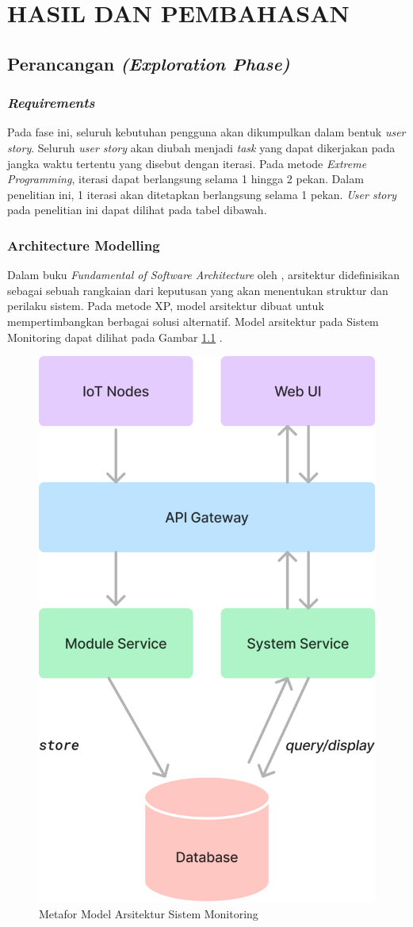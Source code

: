 \chapter{HASIL DAN PEMBAHASAN}

\section{Perancangan \textit{(Exploration Phase)}}

\subsection{\textit{Requirements}}

Pada fase ini, seluruh kebutuhan pengguna akan dikumpulkan dalam bentuk \textit{user story}. Seluruh \textit{user story} akan diubah menjadi \textit{task} yang dapat dikerjakan pada jangka waktu tertentu yang disebut dengan iterasi. Pada metode \textit{Extreme Programming}, iterasi dapat berlangsung selama 1 hingga 2 pekan. Dalam penelitian ini, 1 iterasi akan ditetapkan berlangsung selama 1 pekan. \textit{User story} pada penelitian ini dapat dilihat pada tabel dibawah.



\subsection{Architecture Modelling}

Dalam buku \textit{Fundamental of Software Architecture} oleh \textcite{book:richard}, arsitektur didefinisikan sebagai sebuah rangkaian dari keputusan yang akan menentukan struktur dan perilaku sistem. Pada metode XP, model arsitektur dibuat untuk mempertimbangkan berbagai solusi alternatif. Model arsitektur pada Sistem Monitoring dapat dilihat pada Gambar \ref{fig:archi-model-sm} .

\begin{figure}[!h]
    \includegraphics[width=.4\linewidth, center]{images/hasil/archi-model.png}
    \caption{Metafor Model Arsitektur Sistem Monitoring}
    \label{fig:archi-model-sm}
\end{figure}

